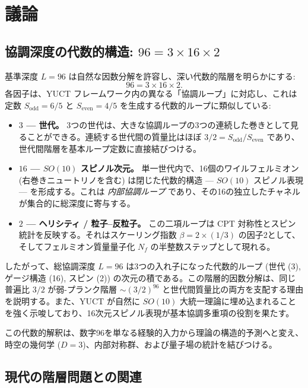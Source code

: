 \documentclass[11pt,a4paper]{article}
\newcommand{\Sodd}{S_{\mathrm{odd}}}
\newcommand{\Seven}{S_{\mathrm{even}}}
\theoremstyle{remark}
\begin{document}
	\section{議論}
	\label{sec:discussion}
	
	\subsection{協調深度の代数的構造: \(96 = 3 \times 16 \times 2\)}
	
	基準深度 \(L = 96\) は自然な因数分解を許容し、深い代数的階層を明らかにする:
	\[
	96 = 3 \times 16 \times 2.
	\]
	各因子は、YUCT フレームワーク内の異なる「協調ループ」に対応し、これは定数 \(\Sodd = 6/5\) と \(\Seven = 4/5\) を生成する代数的ループに類似している:
	
	\begin{itemize}
		\item \textbf{\(3\) — 世代。} 3つの世代は、大きな協調ループの3つの連続した巻きとして見ることができる。連続する世代間の質量比はほぼ \(3/2 = \Sodd/\Seven\) であり、世代間階層を基本ループ定数に直接結びつける。
		\item \textbf{\(16\) — \(SO(10)\) スピノル次元。} 単一世代内で、16個のワイルフェルミオン (右巻きニュートリノを含む) は閉じた代数的構造 — \(SO(10)\) スピノル表現 — を形成する。これは \emph{内部協調ループ} であり、その16の独立したチャネルが集合的に総深度に寄与する。
		\item \textbf{\(2\) — ヘリシティ / 粒子–反粒子。} この二項ループは CPT 対称性とスピン統計を反映する。それはスケーリング指数 \(\beta = 2 \times (1/3)\) の因子2として、そしてフェルミオン質量量子化 \(N_f\) の半整数ステップとして現れる。
	\end{itemize}
	
	したがって、総協調深度 \(L = 96\) は3つの入れ子になった代数的ループ (世代 (3), ゲージ構造 (16), スピン (2)) の次元の積である。この階層的因数分解は、同じ普遍比 \(3/2\) が弱-プランク階層 \(\sim (3/2)^{96}\) と世代間質量比の両方を支配する理由を説明する。また、YUCT が自然に \(SO(10)\) 大統一理論に埋め込まれることを強く示唆しており、16次元スピノル表現が基本協調多重項の役割を果たす。
	
	この代数的解釈は、数字96を単なる経験的入力から理論の構造的予測へと変え、時空の幾何学 (\(D=3\))、内部対称群、および量子場の統計を結びつける。
	
	\subsection{現代の階層問題との関連}
	
\end{document}

